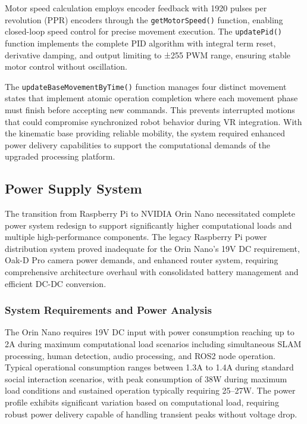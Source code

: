 Motor speed calculation employs encoder feedback with 1920 pulses per revolution (PPR) encoders through the \texttt{getMotorSpeed()} function, enabling closed-loop speed control for precise movement execution. The \texttt{updatePid()} function implements the complete PID algorithm with integral term reset, derivative damping, and output limiting to ±255 PWM range, ensuring stable motor control without oscillation.

The \texttt{updateBaseMovementByTime()} function manages four distinct movement states that implement atomic operation completion where each movement phase must finish before accepting new commands. This prevents interrupted motions that could compromise synchronized robot behavior during VR integration. With the kinematic base providing reliable mobility, the system required enhanced power delivery capabilities to support the computational demands of the upgraded processing platform.

\subsection{Power Supply System}

The transition from Raspberry Pi to NVIDIA Orin Nano necessitated complete power system redesign to support significantly higher computational loads and multiple high-performance components. The legacy Raspberry Pi power distribution system proved inadequate for the Orin Nano's 19V DC requirement, Oak-D Pro camera power demands, and enhanced router system, requiring comprehensive architecture overhaul with consolidated battery management and efficient DC-DC conversion.

\subsubsection{System Requirements and Power Analysis}

The Orin Nano requires 19V DC input with power consumption reaching up to 2A during maximum computational load scenarios including simultaneous SLAM processing, human detection, audio processing, and ROS2 node operation. Typical operational consumption ranges between 1.3A to 1.4A during standard social interaction scenarios, with peak consumption of 38W during maximum load conditions and sustained operation typically requiring 25--27W. The power profile exhibits significant variation based on computational load, requiring robust power delivery capable of handling transient peaks without voltage drop.

